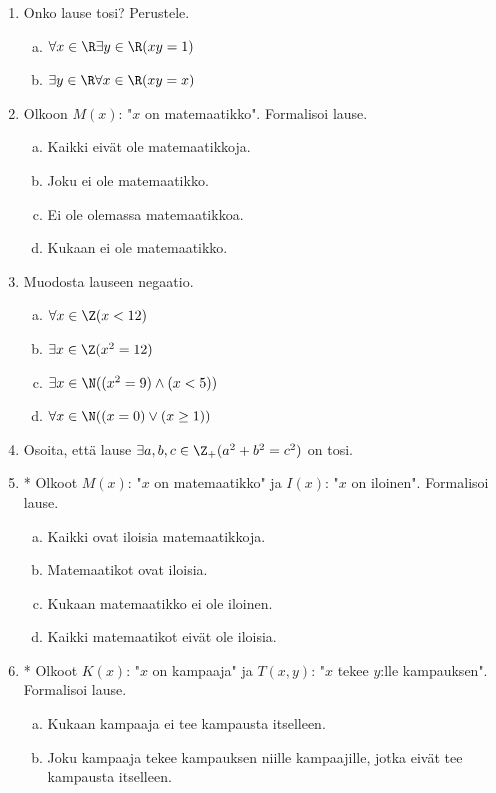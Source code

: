 \begin{enumerate}
\item Onko lause tosi? Perustele.
\begin{enumerate}[a)]
\item $\forall x\in \R\exists y\in \R (xy=1)$
\item $\exists y\in \R\forall x\in \R (xy =x)$
\end{enumerate}

\newpage

\item Olkoon $M(x)$: "$x$ on matemaatikko". Formalisoi lause.

\begin{enumerate}[a)]
\item Kaikki eivät ole matemaatikkoja.
\item Joku ei ole matemaatikko.
\item Ei ole olemassa matemaatikkoa.
\item Kukaan ei ole matemaatikko.
\end{enumerate}

\item
Muodosta lauseen negaatio.
\begin{enumerate}[a)]
\item $\forall x\in \Z (x < 12)$
\item $\exists x\in \Z (x^2 = 12)$
\item $\exists x\in \N ((x^2=9) \land (x<5))$
\item $\forall x\in \N ((x=0)\lor (x\ge 1))$
\end{enumerate}

\item Osoita, että lause $\exists a,b,c \in \Z_{+} (a^2 + b^2 =
c^2)$ on tosi.

\item * %
Olkoot $M(x)$: "$x$ on matemaatikko" ja
$I(x)$: "$x$ on iloinen". Formalisoi lause.
\begin{enumerate}[a)]
\item Kaikki ovat iloisia matemaatikkoja.
\item Matemaatikot ovat iloisia.
\item Kukaan matemaatikko ei ole iloinen.
\item Kaikki matemaatikot eivät ole iloisia.
\end{enumerate}

\item * %
Olkoot $K(x)$: "$x$ on kampaaja" ja
$T(x,y)$: "$x$ tekee $y$:lle kampauksen". Formalisoi lause.
\begin{enumerate}[a)]
\item Kukaan kampaaja ei tee kampausta itselleen.
\item Joku kampaaja tekee kampauksen niille kampaajille,
jotka eivät tee kampausta itselleen.
\end{enumerate}

\end{enumerate}


